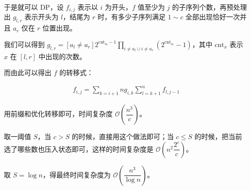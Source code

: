 \documentclass[UTF8,12pt,a4paper]{ctexart} %
\begin{document}
	于是就可以 $\text{DP}$，设 $f_{i,j}$ 表示以 $i$ 为开头，$f$ 值至少为 $j$ 的子序列个数，再预处理出 $g_{l,r}$ 表示开头为 $l$，结尾为 $r$ 时，有多少子序列满足 $1\sim c$ 全部出现恰好一次并且 $a_r$ 仅在 $r$ 位置出现。
	
	我们可以得到 $g_{l,r}=[a_l\ne a_r]2^{\text{cnt}_{a_l}-1}\prod\limits_{i\ne a_l\cup i\ne a_r}(2^{\text{cnt}_{a_l}}-1)$，其中 $\text{cnt}_x$ 表示 $x$ 在 $[l,r]$ 中出现的次数。
	
	而由此可以得出 $f$ 的转移式：
	
	$$
	\begin{aligned}
		f_{i,j}=\sum\limits_{k=i+1}{n}g_{i,k}\sum\limits_{l=k+1}^{n}f_{l,j-1}
	\end{aligned}
	$$
	
	用前缀和优化转移即可，时间复杂度 $\mathcal{O}(\dfrac{n^3}{c})$。
	
	取一阈值 $S$，当 $c>S$ 的时候，直接用这个做法即可；当 $c\le S$ 的时候，把当前选了哪些数也压入状态即可，这样的时间复杂度是 $\mathcal{O}(n^2\dfrac{2^c}{c})$。
	
	取 $S=\log n$，得最终时间复杂度为 $\mathcal{O}(\dfrac{n^3}{\log n})$。
	
\end{document}
